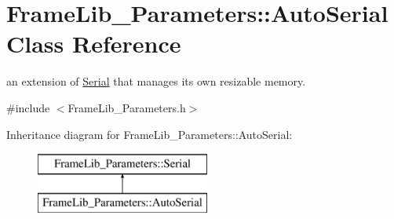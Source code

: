 \hypertarget{class_frame_lib___parameters_1_1_auto_serial}{}\section{Frame\+Lib\+\_\+\+Parameters\+:\+:Auto\+Serial Class Reference}
\label{class_frame_lib___parameters_1_1_auto_serial}


an extension of \hyperlink{class_frame_lib___parameters_1_1_serial}{Serial} that manages its own resizable memory.  




{\ttfamily \#include $<$Frame\+Lib\+\_\+\+Parameters.\+h$>$}

Inheritance diagram for Frame\+Lib\+\_\+\+Parameters\+:\+:Auto\+Serial\+:\begin{figure}[H]
\begin{center}
\leavevmode
\includegraphics[height=2.000000cm]{class_frame_lib___parameters_1_1_auto_serial}
\end{center}
\end{figure}
